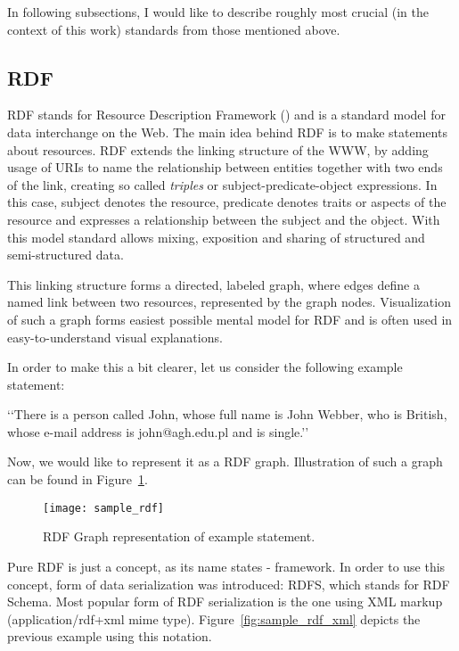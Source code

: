 In following subsections, I would like to describe roughly most crucial (in the context of this work) standards from those mentioned above.

\subsection{RDF}

RDF stands for Resource Description Framework (\cite{rdfPrimer:2004}) and is a standard model for data interchange on the Web. The main idea behind RDF is to make statements about resources. RDF extends the linking structure of the WWW, by adding usage of URIs to name the relationship between entities together with two ends of the link, creating so called \emph{triples} or subject-predicate-object expressions. In this case, subject denotes the resource, predicate denotes traits or aspects of the resource and expresses a relationship between the subject and the object. With this model standard allows mixing, exposition and sharing of structured and semi-structured data.

This linking structure forms a directed, labeled graph, where edges define a named link between two resources, represented by the graph nodes. Visualization of such a graph forms easiest possible mental model for RDF and is often used in easy-to-understand visual explanations.

In order to make this a bit clearer, let us consider the following example statement:

\lq\lq{}There is a person called John, whose full name is John Webber, who is British, whose e-mail address is john@agh.edu.pl and is single.\rq\rq{}

Now, we would like to represent it as a RDF graph. Illustration of such a graph can be found in Figure~\ref{fig:sample_rdf}.

\begin{figure}[ht]
	\centering
	\texttt{[image: sample\_rdf]}
	\caption{RDF Graph representation of example statement.}
	\label{fig:sample_rdf}
\end{figure}

Pure RDF is just a concept, as its name states - framework. In order to use this concept, form of data serialization was introduced: RDFS, which stands for RDF Schema\cite{rdfRef:2004}. Most popular form of RDF serialization is the one using XML markup (application/rdf+xml mime type). Figure~\ref{fig:sample_rdf_xml} depicts the previous example using this notation.

